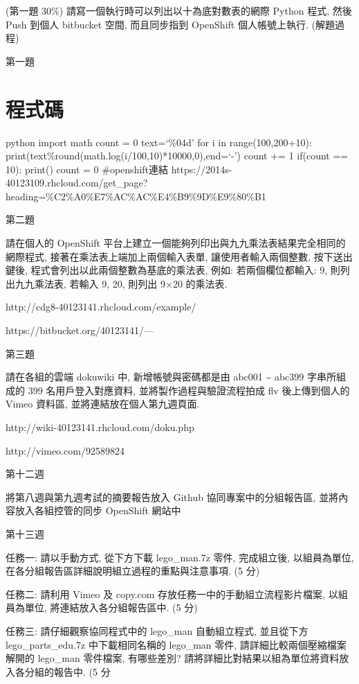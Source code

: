 \documentclass[]{article}
\begin{document}
(第一題 30\%) 請寫一個執行時可以列出以十為底對數表的網際 Python 程式,
然後 Push 到個人 bitbucket 空間, 而且同步指到 OpenShift 個人帳號上執行.
(解題過程)

第一題

\section{程式碼}\label{ux7a0bux5f0fux78bc}

python import math count = 0 text=`\%04d' for i in range(100,200+10):
print(text\%round(math.log(i/100,10)*10000,0),end=`-') count += 1
if(count == 10): print() count = 0 \#openshift連結
https://2014s-40123109.rhcloud.com/get\_page?heading=\%C2\%A0\%E7\%AC\%AC\%E4\%B9\%9D\%E9\%80\%B1

第二題

請在個人的 OpenShift
平台上建立一個能夠列印出與九九乘法表結果完全相同的網際程式,
接著在乘法表上端加上兩個輸入表單, 讓使用者輸入兩個整數, 按下送出鍵後,
程式會列出以此兩個整數為基底的乘法表, 例如: 若兩個欄位都輸入: 9,
則列出九九乘法表, 若輸入 9, 20, 則列出 9×20 的乘法表.

http://cdg8-40123141.rhcloud.com/example/

https://bitbucket.org/40123141/---

第三題

請在各組的雲端 dokuwiki 中, 新增帳號與密碼都是由 abc001
\textasciitilde{} abc399 字串所組成的 399 名用戶登入對應資料,
並將製作過程與驗證流程拍成 flv 後上傳到個人的 Vimeo 資料區,
並將連結放在個人第九週頁面.

http://wiki-40123141.rhcloud.com/doku.php

http://vimeo.com/92589824

第十二週

將第八週與第九週考試的摘要報告放入 Github 協同專案中的分組報告區,
並將內容放入各組控管的同步 OpenShift 網站中

第十三週

任務一: 請以手動方式, 從下方下載 lego\_man.7z 零件, 完成組立後,
以組員為單位, 在各分組報告區詳細說明組立過程的重點與注意事項. (5 分)

任務二: 請利用 Vimeo 及 copy.com 存放任務一中的手動組立流程影片檔案,
以組員為單位, 將連結放入各分組報告區中. (5 分)

任務三: 請仔細觀察協同程式中的 lego\_man 自動組立程式, 並且從下方
lego\_parts\_edu.7z 中下載相同名稱的 lego\_man 零件,
請詳細比較兩個壓縮檔案解開的 lego\_man 零件檔案, 有哪些差別?
請將詳細比對結果以組為單位將資料放入各分組的報告中. (5 分
\end{document}
